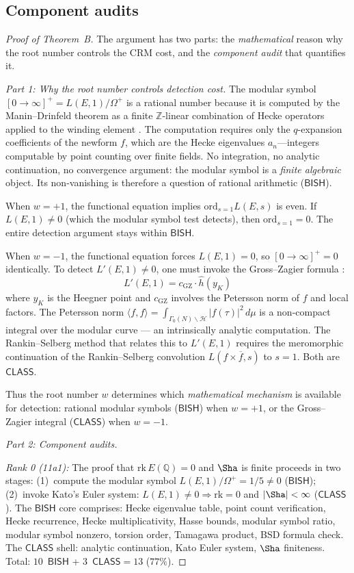 \documentclass[11pt]{article}
\theoremstyle{plain}
\theoremstyle{definition}
\theoremstyle{remark}
\newcommand{\Z}{\mathbb{Z}}
\newcommand{\Q}{\mathbb{Q}}
\newcommand{\rk}{\mathrm{rk}}
\newcommand{\ord}{\mathrm{ord}}
\newcommand{\BISH}{\ensuremath{\mathsf{BISH}}}
\newcommand{\CLASS}{\ensuremath{\mathsf{CLASS}}}
\newcommand{\hhat}{\hat{h}}
\begin{document}
\subsection{Component audits}

\begin{proof}[Proof of Theorem~B]
The argument has two parts: the \emph{mathematical} reason why the root number controls the CRM cost, and the \emph{component audit} that quantifies it.

\emph{Part 1: Why the root number controls detection cost.}
The modular symbol $[0 \to \infty]^+ = L(E,1)/\Omega^+$ is a rational number because it is computed by the Manin--Drinfeld theorem as a finite $\Z$-linear combination of Hecke operators applied to the winding element \cite{manin,cremona}. The computation requires only the $q$-expansion coefficients of the newform $f$, which are the Hecke eigenvalues $a_n$---integers computable by point counting over finite fields. No integration, no analytic continuation, no convergence argument: the modular symbol is a \emph{finite algebraic} object. Its non-vanishing is therefore a question of rational arithmetic ($\BISH$).

When $w = +1$, the functional equation implies $\ord_{s=1} L(E,s)$ is even. If $L(E,1) \neq 0$ (which the modular symbol test detects), then $\ord_{s=1} = 0$. The entire detection argument stays within $\BISH$.

When $w = -1$, the functional equation forces $L(E,1) = 0$, so $[0 \to \infty]^+ = 0$ identically. To detect $L'(E,1) \neq 0$, one must invoke the Gross--Zagier formula \cite{gross-zagier}:
\[
L'(E,1) = c_{\mathrm{GZ}} \cdot \hhat(y_K)
\]
where $y_K$ is the Heegner point and $c_{\mathrm{GZ}}$ involves the Petersson norm of $f$ and local factors. The Petersson norm $\langle f, f \rangle = \int_{\Gamma_0(N) \backslash \mathcal{H}} |f(\tau)|^2 \, d\mu$ is a non-compact integral over the modular curve --- an intrinsically analytic computation. The Rankin--Selberg method that relates this to $L'(E,1)$ requires the meromorphic continuation of the Rankin--Selberg convolution $L(f \times \overline{f}, s)$ to $s = 1$. Both are $\CLASS$.

Thus the root number $w$ determines which \emph{mathematical mechanism} is available for detection: rational modular symbols ($\BISH$) when $w = +1$, or the Gross--Zagier integral ($\CLASS$) when $w = -1$.

\emph{Part 2: Component audits.}

\emph{Rank 0 (11a1):} The proof that $\rk\, E(\Q) = 0$ and $\Sha$ is finite proceeds in two stages: (1)~compute the modular symbol $L(E,1)/\Omega^+ = 1/5 \neq 0$ ($\BISH$); (2)~invoke Kato's Euler system: $L(E,1) \neq 0 \Rightarrow \rk = 0$ and $|\Sha| < \infty$ ($\CLASS$). The $\BISH$ core comprises: Hecke eigenvalue table, point count verification, Hecke recurrence, Hecke multiplicativity, Hasse bounds, modular symbol ratio, modular symbol nonzero, torsion order, Tamagawa product, BSD formula check. The $\CLASS$ shell: analytic continuation, Kato Euler system, $\Sha$ finiteness. Total: $10$~$\BISH$ + $3$~$\CLASS = 13$ ($77\%$).


\end{proof}
\end{document}

